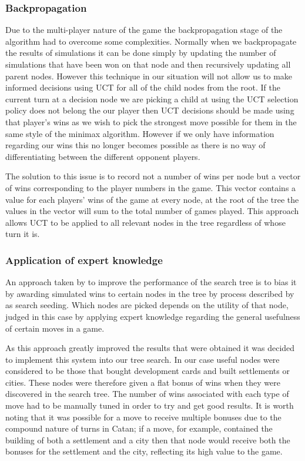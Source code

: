 \documentclass[]{article}
\begin{document}
\subsubsection{Backpropagation}
Due to the multi-player nature of the game the backpropagation stage of the algorithm had to overcome some complexities. Normally when we backpropagate the results of simulations it can be done simply by updating the number of simulations that have been won on that node and then recursively updating all parent nodes. However this technique in our situation will not allow us to make informed decisions using UCT for all of the child nodes from the root. If the current turn at a decision node we are picking a child at using the UCT selection policy does not belong the our player then UCT decisions should be made using that player's wins as we wish to pick the strongest move possible for them in the same style of the minimax algorithm. However if we only have information regarding our wins this no longer becomes possible as there is no way of differentiating between the different opponent players.

\par The solution to this issue is to record not a number of wins per node but a vector of wins corresponding to the player numbers in the game. This vector contains a value for each players' wins of the game at every node, at the root of the tree the values in the vector will sum to the total number of games played. This approach allows UCT to be applied to all relevant nodes in the tree regardless of whose turn it is.

\subsubsection{Application of expert knowledge}
An approach taken by \textcite{szita2009monte} to improve the performance of the search tree is to bias it by awarding simulated wins to certain nodes in the tree by process described by \textcite{browne2012survey} as search seeding. Which nodes are picked depends on the utility of that node, judged in this case by applying expert knowledge regarding the general usefulness of certain moves in a game. 

\par As this approach greatly improved the results that were obtained it was decided to implement this system into our tree search. In our case useful nodes were considered to be those that bought development cards and built settlements or cities. These nodes were therefore given a flat bonus of wins when they were discovered in the search tree. The number of wins associated with each type of move had to be manually tuned in order to try and get good results. It is worth noting that it was possible for a move to receive multiple bonuses due to the compound nature of turns in Catan; if a move, for example, contained the building of both a settlement and a city then that node would receive both the bonuses for the settlement and the city, reflecting its high value to the game.    
\end{document}
